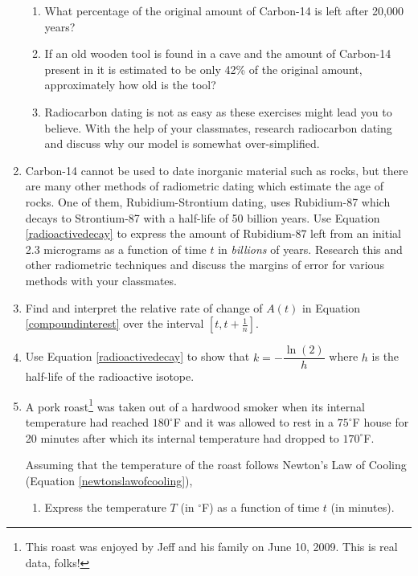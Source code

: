 \begin{enumerate}
\begin{enumerate}
\item What percentage of the original amount of Carbon-14 is left after 20,000 years?

\item If an old wooden tool is found in a cave and the amount of Carbon-14 present in it is estimated to be only 42\% of the original amount, approximately how old is the tool?

\item Radiocarbon dating is not as easy as these exercises might lead you to believe.  With the help of your classmates, research radiocarbon dating and discuss why our model is somewhat over-simplified.  

\end{enumerate}

\item Carbon-14 cannot be used to date inorganic material such as rocks, but there are many other methods of radiometric dating which estimate the age of rocks.  One of them, Rubidium-Strontium dating, uses Rubidium-87 which decays to Strontium-87 with a half-life of 50 billion years.  Use Equation \ref{radioactivedecay} to express the amount of Rubidium-87 left from an initial 2.3 micrograms as a function of time $t$ in \emph{billions} of years.  Research this and other radiometric techniques and discuss the margins of error for various methods with your classmates.

\item  Find and interpret the relative rate of change of  $A(t)$ in Equation \ref{compoundinterest} over the interval $\left[t, t+\frac{1}{n} \right]$.

\item Use Equation \ref{radioactivedecay} to show that $k = -\dfrac{\ln(2)}{h}$ where $h$ is the half-life of the radioactive isotope.

\item A pork roast\footnote{This roast was enjoyed by Jeff and his family on June 10, 2009.  This is real data, folks!} was taken out of a hardwood smoker when its internal temperature had reached $180^{\circ}$F and it was allowed to rest in a $75^{\circ}$F house for 20 minutes after which its internal temperature had dropped to $170^{\circ}$F. 

Assuming that the temperature of the roast follows Newton's Law of Cooling (Equation \ref{newtonslawofcooling}),

\begin{enumerate}

\item Express the temperature $T$ (in $^{\circ}$F) as a function of time $t$ (in minutes).


\end{enumerate}
\end{enumerate}
